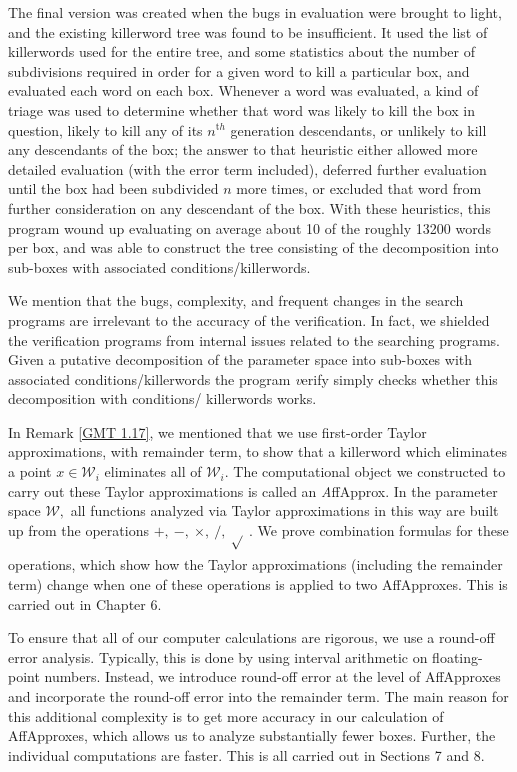 \begin{remark}
The final version was created when the bugs in evaluation were 
brought to light, and the existing killerword tree was found to be insufficient.  
It used the list of killerwords used for the entire tree, and some 
statistics about the number of subdivisions required in order for a 
given word to kill a particular box, and evaluated each word on each box.  Whenever 
a word was evaluated, a kind of triage was used to determine 
whether that word was likely to kill the box in question, likely to kill 
any of its $n^{\mathrm th}$ generation descendants, or unlikely to kill any 
descendants of the box; the answer to that heuristic either allowed more 
detailed evaluation (with the error term included), deferred further 
evaluation until the box had been subdivided $n$ more times, or 
excluded that word from further consideration on any descendant of 
the box.  With these heuristics, this program wound up evaluating on 
average about 10 of the roughly 13200 words per box, and was able to 
construct the tree consisting of the decomposition into sub-boxes with associated conditions/killerwords.

We mention that the bugs, complexity, and 
frequent changes in the search programs are irrelevant to the 
accuracy of the verification.  In fact, we shielded the verification 
programs from internal issues related to the searching programs.  
Given a putative decomposition of the parameter space into 
sub-boxes with associated conditions/killerwords the program {\textit verify} 
simply checks whether this decomposition with conditions/ 
killerwords works. 
\end{remark}

\begin{preview}\label{GMT 1.35}
	In Remark \ref{GMT 1.17}, we mentioned that we use first-order Taylor approximations, with remainder term, to show that
a killerword which eliminates a point $x\in {\mathcal W}_i$ eliminates all of ${\mathcal W}_i.$  
The computational object we constructed to carry out these Taylor approximations is called an {\textit AffApprox}.
In the parameter space ${\mathcal W},$ all functions analyzed via Taylor
approximations in this way are built up from the
operations $ +,\ -,\ \times, \  /,\ \sqrt{}_{\phantom{|}} .$  We prove combination
formulas for these operations, which show how the Taylor approximations
(including the remainder term) change when one of these operations is
applied to two AffApproxes.   This is carried out in
	Chapter 6. %

To ensure that all of our computer calculations are rigorous, we use a round-off error analysis.  Typically, this is done by using interval
arithmetic on floating-point numbers. 
Instead, we introduce
round-off error at the level of AffApproxes and
incorporate the round-off error into the remainder term.  
The main reason for this additional complexity is to get
more accuracy in our calculation of AffApproxes, 
which allows us to analyze substantially fewer boxes.
Further, the individual computations are faster.
This is all
carried out in
	Sections 7 and 8.%
\end{preview}
